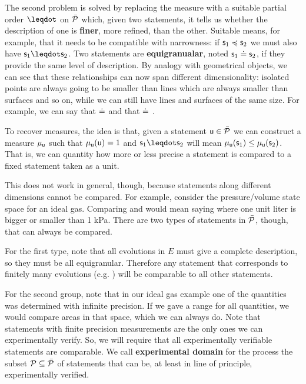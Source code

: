\documentclass[letterpaper]{article}
\begin{document}
The second problem is solved by replacing the measure with a suitable partial order $\finer$ on $\tdomain[P]$ which, given two statements, it tells us whether the description of one is \textbf{finer}, more refined, than the other. Suitable means, for example, that it needs to be compatible with narrowness: if $\stmt_1 \narrower\stmt_2$ we must also have $\stmt_1 \finer \stmt_2$. Two statements are \textbf{equigranualar}, noted $\stmt_1 \eqgran \stmt_2$, if they provide the same level of description. By analogy with geometrical objects, we can see that these relationships can now span different dimensionality: isolated points are always going to be smaller than lines which are always smaller than surfaces and so on, while we can still have lines and surfaces of the same size. For example, we can say that  $\eqgran$  and that  $\eqgran$ .

To recover measures, the idea is that, given a statement $\stmt[u] \in \tdomain[P]$ we can construct a measure $\mu_{\stmt[u]}$ such that $\mu_{\stmt[u]}(\stmt[u]) = 1$ and $\stmt_1 \finer \stmt_2$ will mean $\mu_{\stmt[u]}(\stmt_1) \leq \mu_{\stmt[u]}(\stmt_2)$. That is, we can quantity how more or less precise a statement is compared to a fixed statement taken as a unit.

This does not work in general, though, because statements along different dimensions cannot be compared. For example, consider the pressure/volume state space for an ideal gas. Comparing  and  would mean saying where one unit liter is bigger or smaller than 1 kPa. There are two types of statements in $\tdomain[P]$, though, that can always be compared.

For the first type, note that all evolutions in $E$ must give a complete description, so they must be all equigranular. Therefore any statement that corresponds to finitely many evolutions (e.g. ) will be comparable to all other statements.

For the second group, note that in our ideal gas example one of the quantities was determined with infinite precision. If we gave a range for all quantities, we would compare areas in that space, which we can always do. Note that statements with finite precision measurements are the only ones we can experimentally verify. So, we will require that all experimentally verifiable statements are comparable. We call \textbf{experimental domain} for the process the subset $\edomain[P] \subseteq \tdomain[P]$ of statements that can be, at least in line of principle, experimentally verified.
\end{document}
